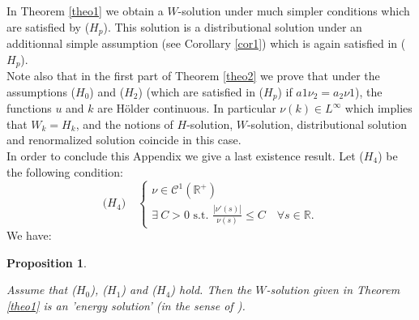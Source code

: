 \documentclass{elsart}
\newtheorem{pro}[defi]{Proposition}
\begin{document}
In Theorem \ref{theo1} we obtain a $W$-solution under much 
simpler conditions which are satisfied by ($H_p$). This solution is a
distributional solution under an additionnal simple assumption (see Corollary
\ref{cor1}) 
which is again satisfied in ($H_p$). \\ 

Note also that in the first part of Theorem \ref{theo2} we prove that under the
assumptions ($H_0$) and ($H_2$) (which are satisfied in ($H_p$) if 
$a1\nu_2 = a_2\nu1$), the functions $u$ and $k$ are H\"older 
continuous. In particular $\nu(k) \in L^{\infty}$ which implies that 
$W_k = H_k$, and the notions of $H$-solution, $W$-solution,
distributional solution and renormalized solution coincide in this
case. \\    
 
In order to conclude this Appendix we give a last existence result. Let 
($H_4$) be the following condition: 
$$
\text{($H_4$)}  \quad\left\{
	\begin{array}{l}
	  \nu \in \mathcal{C}^1(\mathbb R^{+}) \\ 
	  \exists \ C > 0 \text{ s.t. } \frac{|\nu'(s)|}{\nu(s)} \leq C
	  \quad \forall s \in \mathbb R.
	\end{array}
	\right.
$$
We have: 

\begin{pro} \label{propfin}

Assume that ($H_0$), ($H_1$) and ($H_4$) hold. Then the
$W$-solution given in Theorem \ref{theo1} is an 'energy solution' (in
the sense of \cite{gal}).

\end{pro}
\end{document}

